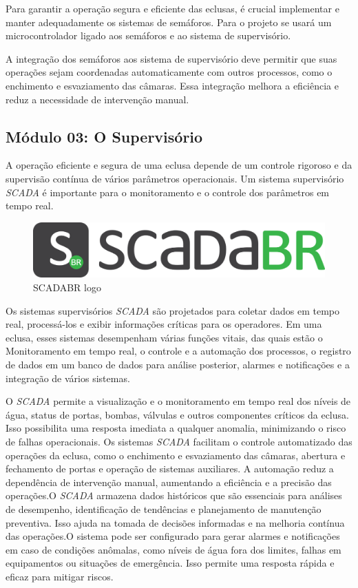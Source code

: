 Para garantir a operação segura e eficiente das eclusas, é crucial implementar e manter adequadamente os sistemas de semáforos. Para o projeto se usará um microcontrolador ligado aos semáforos e ao sistema de supervisório. 

A integração dos semáforos aos sistema de supervisório deve permitir que suas operações sejam coordenadas automaticamente com outros processos, como o enchimento e esvaziamento das câmaras. Essa integração melhora a eficiência e reduz a necessidade de intervenção manual.


\subsection{Módulo 03: O Supervisório}

A operação eficiente e segura de uma eclusa depende de um controle rigoroso e da supervisão contínua de vários parâmetros operacionais. Um sistema supervisório \textit{SCADA} é importante para o monitoramento e o controle dos parâmetros em tempo real.

\begin{figure}[h]
	\centering
	\label{fig:diag_pocos}
		\includegraphics[keepaspectratio=true,scale=0.6]{figuras/scadabr_logo.png}
	\caption{SCADABR logo}
\end{figure}

Os sistemas supervisórios \textit{SCADA} são projetados para coletar dados em tempo real, processá-los e exibir informações críticas para os operadores. Em uma eclusa, esses sistemas desempenham várias funções vitais, das quais estão o Monitoramento em tempo real, o controle e a automação dos processos, o registro de dados em um banco de dados para análise posterior, alarmes e notificações e a integração de vários sistemas.

O \textit{SCADA} permite a visualização e o monitoramento em tempo real dos níveis de água, status de portas, bombas, válvulas e outros componentes críticos da eclusa. Isso possibilita uma resposta imediata a qualquer anomalia, minimizando o risco de falhas operacionais. Os sistemas \textit{SCADA} facilitam o controle automatizado das operações da eclusa, como o enchimento e esvaziamento das câmaras, abertura e fechamento de portas e operação de sistemas auxiliares. A automação reduz a dependência de intervenção manual, aumentando a eficiência e a precisão das operações.O \textit{SCADA} armazena dados históricos que são essenciais para análises de desempenho, identificação de tendências e planejamento de manutenção preventiva. Isso ajuda na tomada de decisões informadas e na melhoria contínua das operações.O sistema pode ser configurado para gerar alarmes e notificações em caso de condições anômalas, como níveis de água fora dos limites, falhas em equipamentos ou situações de emergência. Isso permite uma resposta rápida e eficaz para mitigar riscos.


